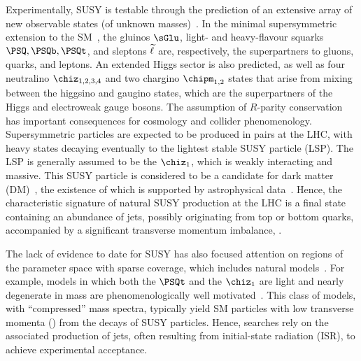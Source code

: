 Experimentally, SUSY is testable through the prediction of an
extensive array of new observable states (of unknown
masses)~\cite{ref:SUSY4, ref:SUSY2}. In the minimal supersymmetric
extension to the SM~\cite{ref:SUSY2}, the gluinos $\sGlu$, light- and
heavy-flavour squarks $\PSQ, \PSQb, \PSQt$, and sleptons $\widetilde{\ell}$ are,
respectively, the superpartners to gluons, quarks, and leptons. An
extended Higgs sector is also predicted, as well as four neutralino
$\chiz_{1,2,3,4}$ and two chargino $\chipm_{1,2}$ states that arise
from mixing between the higgsino and gaugino states, which are the
superpartners of the Higgs and electroweak gauge bosons.  The
assumption of $R$-parity conservation~\cite{Farrar:1978xj} has
important consequences for cosmology and collider
phenomenology. Supersymmetric particles are expected to be produced in
pairs at the LHC, with heavy states decaying eventually to the
lightest stable SUSY particle (LSP). The LSP is generally assumed to
be the $\chiz_1$, which is weakly interacting and massive. This SUSY
particle is considered to be a candidate for dark matter
(DM)~\cite{Jungman:1995df}, the existence of which is supported by
astrophysical data~\cite{1674-1137-38-9-090001}.  Hence, the
characteristic signature of natural SUSY production at the LHC is a
final state containing an abundance of jets, possibly originating from
top or bottom quarks, accompanied by a significant transverse momentum
imbalance, \ptvecmiss.

The lack of evidence to date for SUSY has also focused attention on
regions of the parameter space with sparse coverage, which includes
natural models~\cite{Delgado:2012eu, Boehm:1999tr, Carena:2008mj,
  Grober:2014aha, Grober:2015fia}. For example, models in which both
the $\PSQt$ and the $\chiz_1$ are light and nearly degenerate in mass
are phenomenologically well motivated~\cite{Boehm:1999bj,
  Balazs:2004bu, Martin:2007gf, Martin:2007hn}. This class of models,
with ``compressed'' mass spectra, typically yield SM particles with
low transverse momenta (\Pt) from the decays of SUSY particles. Hence,
searches rely on the associated production of jets, often resulting
from initial-state radiation (ISR), to achieve experimental
acceptance.

